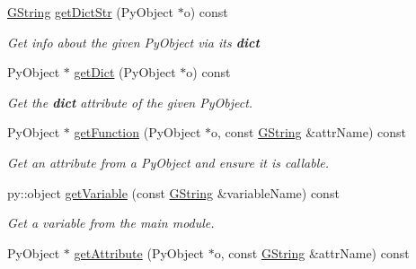 \begin{Indent}
\begin{DoxyCompactItemize}
\mbox{\hyperlink{classrev_1_1_g_string}{G\+String}} \mbox{\hyperlink{classrev_1_1_python_a_p_i_a07a00036ee0daee74060b239be97c7a3}{get\+Dict\+Str}} (Py\+Object $\ast$o) const
\begin{DoxyCompactList}\small\item\em Get info about the given Py\+Object via its {\bfseries{dict}} \end{DoxyCompactList}\item 
\mbox{\label{classrev_1_1_python_a_p_i_ae5fbd8bbdb76278a45d4c46d97a60a17}} 
Py\+Object $\ast$ \mbox{\hyperlink{classrev_1_1_python_a_p_i_ae5fbd8bbdb76278a45d4c46d97a60a17}{get\+Dict}} (Py\+Object $\ast$o) const
\begin{DoxyCompactList}\small\item\em Get the {\bfseries{dict}} attribute of the given Py\+Object. \end{DoxyCompactList}\item 
\mbox{\label{classrev_1_1_python_a_p_i_a59836cac65b32171eafbc994b1b358b7}} 
Py\+Object $\ast$ \mbox{\hyperlink{classrev_1_1_python_a_p_i_a59836cac65b32171eafbc994b1b358b7}{get\+Function}} (Py\+Object $\ast$o, const \mbox{\hyperlink{classrev_1_1_g_string}{G\+String}} \&attr\+Name) const
\begin{DoxyCompactList}\small\item\em Get an attribute from a Py\+Object and ensure it is callable. \end{DoxyCompactList}\item 
\mbox{\label{classrev_1_1_python_a_p_i_a4732482778b88b4971a3abc32d2a3e2f}} 
py\+::object \mbox{\hyperlink{classrev_1_1_python_a_p_i_a4732482778b88b4971a3abc32d2a3e2f}{get\+Variable}} (const \mbox{\hyperlink{classrev_1_1_g_string}{G\+String}} \&variable\+Name) const
\begin{DoxyCompactList}\small\item\em Get a variable from the main module. \end{DoxyCompactList}\item 
\mbox{\label{classrev_1_1_python_a_p_i_aa7077afd2156959c9260263c7ab82594}} 
Py\+Object $\ast$ \mbox{\hyperlink{classrev_1_1_python_a_p_i_aa7077afd2156959c9260263c7ab82594}{get\+Attribute}} (Py\+Object $\ast$o, const \mbox{\hyperlink{classrev_1_1_g_string}{G\+String}} \&attr\+Name) const

\end{DoxyCompactItemize}
\end{Indent}
